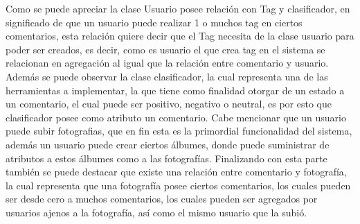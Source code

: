 \documentclass{memoria}
\begin{document}

Como se puede apreciar la clase Usuario posee relación con Tag y clasificador, en significado de que un usuario puede realizar 1 o muchos tag en ciertos comentarios, esta relación quiere decir que el Tag necesita de la clase usuario para poder ser creados, es decir, como es usuario el que crea tag en el sistema se relacionan en agregación al igual que la relación entre comentario y usuario. 
Además se puede observar la clase clasificador, la cual representa una de las herramientas a implementar, la que tiene como finalidad otorgar de un estado a un comentario, el cual puede ser positivo, negativo o neutral, es por esto que clasificador posee como atributo un comentario.
Cabe mencionar que un usuario puede subir fotografias, que en fin esta es la primordial funcionalidad del sistema, además un usuario puede crear ciertos álbumes, donde puede suministrar de atributos a estos álbumes como a las fotografías.
Finalizando con esta parte también se puede destacar que existe una relación entre comentario y fotografía, la cual representa que una fotografía posee ciertos comentarios, los cuales pueden ser desde cero a muchos comentarios, los cuales pueden ser agregados por usuarios ajenos a la fotografía, así como el mismo usuario que la subió.
\end{document}
